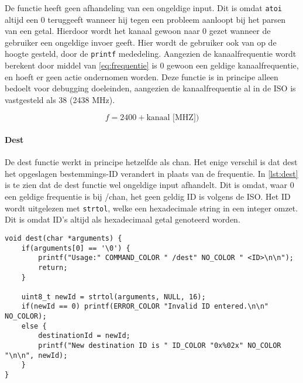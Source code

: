 De functie heeft geen afhandeling van een ongeldige input. Dit is omdat \texttt{atoi} altijd een 0 teruggeeft wanneer hij tegen een probleem aanloopt bij het parsen van een getal. Hierdoor wordt het kanaal gewoon naar 0 gezet wanneer de gebruiker een ongeldige invoer geeft. Hier wordt de gebruiker ook van op de hoogte gesteld, door de \texttt{printf} mededeling. Aangezien de kanaalfrequentie wordt berekent door middel van \autoref{eq:frequentie} is 0 gewoon een geldige kanaalfrequentie, en hoeft er geen actie ondernomen worden. Deze functie is in principe alleen bedoelt voor debugging doeleinden, aangezien de kanaalfrequentie al in de ISO is vastgesteld als 38 (2438 MHz).

\begin{equation} \label{eq:frequentie}
    f = 2400 + \textrm{kanaal [MHZ]})
\end{equation}

\paragraph{Dest}
De dest functie werkt in principe hetzelfde als chan. Het enige verschil is dat dest het opgeslagen bestemmings-ID verandert in plaats van de frequentie. In \autoref{lst:dest} is te zien dat de dest functie wel ongeldige input afhandelt. Dit is omdat, waar 0 een geldige frequentie is bij /chan, het geen geldig ID is volgens de ISO. Het ID wordt uitgelezen met \texttt{strtol}, welke een hexadecimale string in een integer omzet. Dit is omdat ID's altijd als hexadecimaal getal genoteerd worden.

\begin{lstlisting}[caption={De dest functie},captionpos=b,label={lst:dest},style=c,xleftmargin=.\textwidth,xrightmargin=.\textwidth]
void dest(char *arguments) {
    if(arguments[0] == '\0') {
        printf("Usage:" COMMAND_COLOR " /dest" NO_COLOR " <ID>\n\n");
        return;
    }

    uint8_t newId = strtol(arguments, NULL, 16);
    if(newId == 0) printf(ERROR_COLOR "Invalid ID entered.\n\n" NO_COLOR);
    else {
        destinationId = newId;
        printf("New destination ID is " ID_COLOR "0x%02x" NO_COLOR "\n\n", newId);
    }
}
\end{lstlisting}


